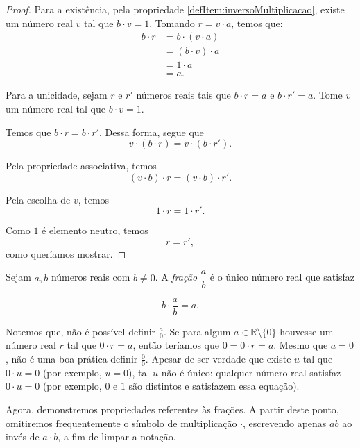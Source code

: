 \begin{proof}
    Para a existência, pela propriedade \ref{defItem:inversoMultiplicacao}, existe um número real $v$ tal que $b\cdot v=1$.
    Tomando $r=v\cdot a$, temos que:
    \begin{align*}
    b\cdot r &= b\cdot (v\cdot a) \tag{pela definição de $r$} \\
    &= (b\cdot v)\cdot a \tag{propriedade associativa} \\
    &= 1\cdot a \tag{pela escolha de $v$} \\
    &= a. \tag{elemento neutro da multiplicação}
    \end{align*}

    Para a unicidade, sejam $r$ e $r'$ números reais tais que $b\cdot r=a$ e $b\cdot r'=a$.
    Tome $v$ um número real tal que $b\cdot v=1$.
    
    Temos que $b\cdot r = b\cdot r'$.
    Dessa forma, segue que
    \[
        v \cdot (b\cdot r) = v \cdot (b\cdot r').
    \]

    Pela propriedade associativa, temos
    \[
        (v \cdot b)\cdot r = (v \cdot b)\cdot r'.
    \]
    
    Pela escolha de $v$, temos
    \[
        1\cdot r = 1\cdot r'.
    \]
    
    Como $1$ é elemento neutro, temos
    \[
        r = r',
    \]
    como queríamos mostrar.
\end{proof}

\begin{definition}
    Sejam $a, b$ números reais com $b\neq 0$.
    A \emph{fração} $\dfrac{a}{b}$ é o único número real que satisfaz

    \[
        b\cdot \frac{a}{b} = a.
    \]
\end{definition}

Notemos que, não é possível definir $\frac{a}{0}$.
Se para algum $a \in \mathbb R\setminus\{0\}$ houvesse um número real $r$ tal que $0\cdot r=a$, então teríamos que $0=0\cdot r=a$.
Mesmo que $a=0$, não é uma boa prática definir $\frac{0}{0}$.
Apesar de ser verdade que existe $u$ tal que $0\cdot u=0$ (por exemplo, $u=0$), tal $u$ não é único: qualquer número real satisfaz $0\cdot u=0$ (por exemplo, $0$ e $1$ são distintos e satisfazem essa equação).

Agora, demonstremos propriedades referentes às frações.
A partir deste ponto, omitiremos frequentemente o símbolo de multiplicação $\cdot$, escrevendo apenas $ab$ ao invés de $a\cdot b$, a fim de limpar a notação.

